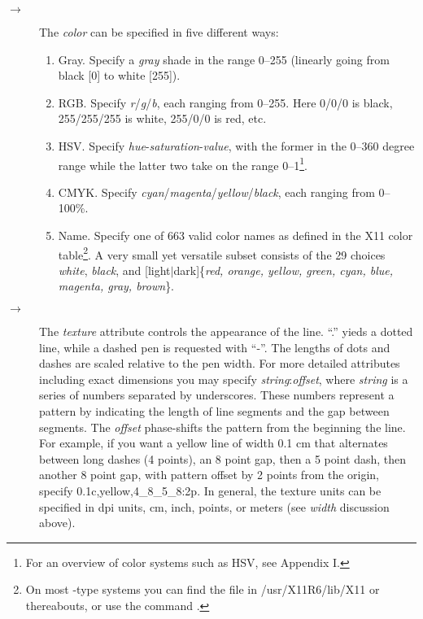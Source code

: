 \begin{description}
%
\item[$\rightarrow$]The {\it color} can be specified in five different ways:
\begin{enumerate}
\item Gray. Specify a {\it gray} shade in the range 0--255 (linearly going from black [0] to white [255]).
\item RGB. Specify {\it r}/{\it g}/{\it b}, each ranging from 0--255.  Here 0/0/0 is black, 255/255/255 is white,
255/0/0 is red, etc.
\item HSV. Specify {\it hue}-{\it saturation}-{\it value}, with the former in the 0--360 degree range while the latter
two take on the range 0--1\footnote{For an overview of color systems such as HSV, see Appendix I.}.
\item CMYK. Specify {\it cyan}/{\it magenta}/{\it yellow}/{\it black}, each ranging from 0--100\%.
\item Name.  Specify one of 663 valid color names as defined in the X11 color table\footnote{On most \UNIX-type systems
you can find the file  in /usr/X11R6/lib/X11 or thereabouts, or use the command .}.
A very small yet versatile subset consists of the 29 choices {\it white}, {\it black}, and [light$|$dark]\{{\it red,
orange, yellow, green, cyan, blue, magenta, gray, brown}\}.
\end{enumerate}

%
\item[$\rightarrow$]The {\it texture} attribute controls the appearance
of the line.  ``.'' yieds a dotted line, while a dashed pen is requested with ``-''.
The lengths of dots and dashes are scaled relative to the pen width.
For more detailed attributes including exact dimensions you may specify {\it string}:{\it offset},
where {\it string} is a series of numbers separated by underscores.
These numbers represent a pattern by indicating the length of line
segments and the gap between segments.  The {\it offset} phase-shifts the
pattern from the beginning the line.  For example, if you want a yellow line of width
0.1 cm that alternates between long dashes (4 points), an 8 point gap, then
a 5 point dash, then another 8 point gap, with pattern offset by 2 points
from the origin, specify 0.1c,yellow,4\_8\_5\_8:2p.
In general, the texture units can be specified in dpi units, cm, inch, points,
or meters (see \emph{width} discussion above). 
\end{description} 

